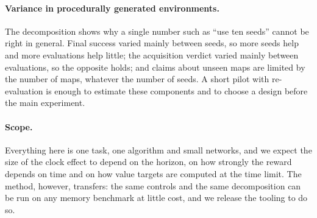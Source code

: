 \paragraph{Variance in procedurally generated environments.}
The decomposition shows why a single number such as ``use ten seeds'' cannot be right in general.
Final success varied mainly between seeds, so more seeds help and more evaluations help little;
the acquisition verdict varied mainly between evaluations, so the opposite holds; and claims about
unseen maps are limited by the number of maps, whatever the number of seeds. A short pilot with
re-evaluation is enough to estimate these components and to choose a design before the main
experiment.

\paragraph{Scope.}
Everything here is one task, one algorithm and small networks, and we expect the size of the
clock effect to depend on the horizon, on how strongly the reward depends on time and on how
value targets are computed at the time limit. The method, however, transfers: the same controls
and the same decomposition can be run on any memory benchmark at little cost, and we release the
tooling to do so.
